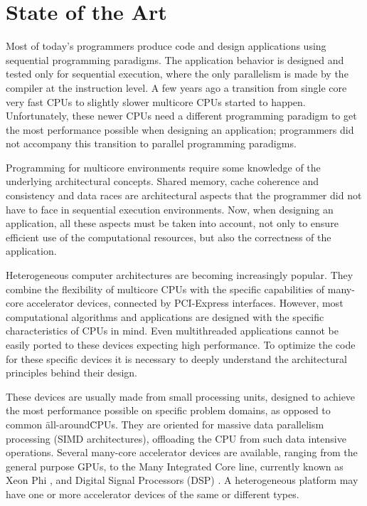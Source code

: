 
\chapter{State of the Art}
\label{stateart}

Most of today’s programmers produce code and design applications using sequential programming paradigms. The application behavior is designed and tested only for sequential execution, where the only parallelism is made by the compiler at the instruction level. A few years ago a transition from single core very fast CPUs to slightly slower multicore CPUs started to happen. Unfortunately, these newer CPUs need a different programming paradigm to get the most performance possible when designing an application; programmers did not accompany this transition to parallel programming paradigms.

Programming for multicore environments require some knowledge of the underlying architectural concepts. Shared memory, cache coherence and consistency and data races are architectural aspects that the programmer did not have to face in sequential execution environments. Now, when designing an application, all these aspects must be taken into account, not only to ensure efficient use of the computational resources, but also the correctness of the application.

Heterogeneous computer architectures are becoming increasingly popular. They combine the flexibility of multicore CPUs with the specific capabilities of many-core accelerator devices, connected by PCI-Express interfaces. However, most computational algorithms and applications are designed with the specific characteristics of CPUs in mind. Even multithreaded applications cannot be easily ported to these devices expecting high performance. To optimize the code for these specific devices it is necessary to deeply understand the architectural principles behind their design.

These devices are usually made from small processing units, designed to achieve the most performance possible on specific problem domains, as opposed to common \"all-around\" CPUs. They are oriented for massive data parallelism processing (SIMD architectures), offloading the CPU from such data intensive operations. Several many-core accelerator devices are available, ranging from the general purpose GPUs, to the \intel Many Integrated Core line, currently known as \intel Xeon Phi \cite{Intel:MIC}, and Digital Signal Processors (DSP) \cite{Texas:DSP}. A heterogeneous platform may have one or more accelerator devices of the same or different types.

